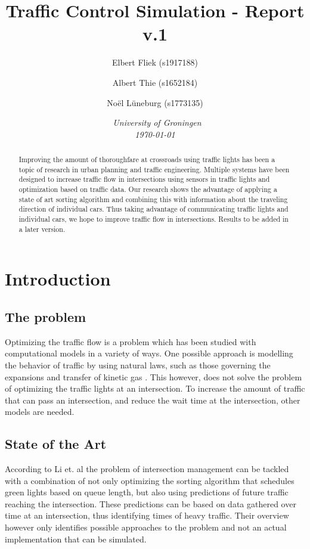 \documentclass{article}
\title{\textbf{\huge Traffic Control Simulation - Report v.1}}
\author{Elbert Fliek (s1917188) \affila \and
    Albert Thie (s1652184) \affila \and
    No\"el L\"uneburg (s1773135) \affila}
\date{\affila\ \textit{University of Groningen \\
\today}}
\begin{document}
\ttl
\thispagestyle{empty}

\begin{abstract}
    Improving the amount of thoroughfare at crossroads using traffic lights has been a topic of research in urban planning and traffic engineering. Multiple systems have been designed to increase traffic flow in intersections using sensors in traffic lights and optimization based on traffic data. Our research shows the advantage of applying a state of art sorting algorithm and combining this with information about the traveling direction of individual cars. Thus taking advantage of communicating traffic lights and individual cars, we hope to improve traffic flow in intersections. Results to be added in a later version.
\end{abstract}



\section{Introduction}
\subsection{The problem}
Optimizing the traffic flow is a problem which has been studied with computational models in a variety of ways. One possible approach is modelling the behavior of traffic by using natural laws, such as those governing the expansions and transfer of kinetic gas \cite{helbing2001master}. This however, does not solve the problem of optimizing the traffic lights at an intersection. To increase the amount of traffic that can pass an intersection, and reduce the wait time at the intersection, other models are needed.

\subsection{State of the Art}
According to Li et. al\cite{survey2014} the problem of intersection management can be tackled with a combination of not only optimizing the sorting algorithm that schedules green lights based on queue length, but also using predictions of future traffic reaching the intersection. These predictions can be based on data gathered over time at an intersection, thus identifying times of heavy traffic. Their overview however only identifies possible approaches to the problem and not an actual implementation that can be simulated.
\end{document}
